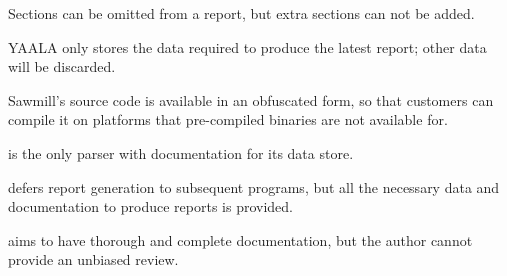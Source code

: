 \begin{table}[htb]
    \begin{eqlist}

        \item [\dag{}] Sections can be omitted from a report, but extra
            sections can not be added.

        \item [\ddag{}] YAALA only stores the data required to produce the
            latest report; other data will be discarded.

        \item [\nialpha{}] Sawmill's source code is available in an
            obfuscated form, so that customers can compile it on platforms
            that pre-compiled binaries are not available for.

        \item [\nibeta{}] \parsername{} is the only parser with
            documentation for its data store.

        \item [\nichi{}] \parsername{} defers report generation to
            subsequent programs, but all the necessary data and
            documentation to produce reports is provided.

        \item [\niepsilon{}] \parsername{} aims to have thorough and
            complete documentation, but the author cannot provide an
            unbiased review.

    \end{eqlist}

\end{table}

\clearpage{}
